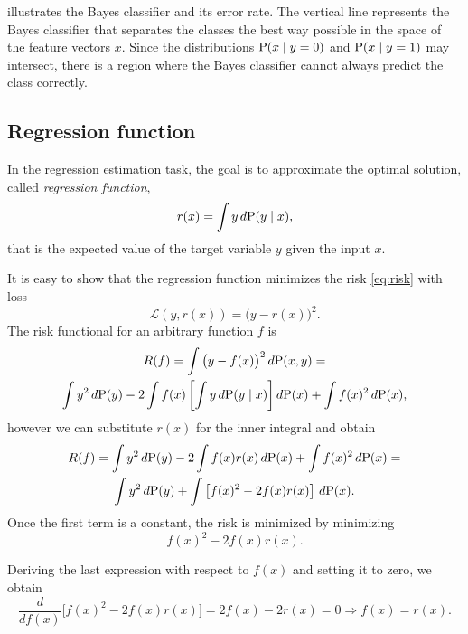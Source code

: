  illustrates the Bayes classifier and its error rate.
The vertical line represents the Bayes classifier that separates the classes the best way
possible in the space of the feature vectors $x$.  Since the distributions $\operatorname{P}(x \mid y
= 0)$ and $\operatorname{P}(x \mid y = 1)$ may intersect, there is a region where the Bayes
classifier cannot always predict the class correctly.

\subsection{Regression function}

In the regression estimation task, the goal is to approximate the optimal solution, called
\emph{regression function},
\begin{equation}
  \label{eq:regression-function}
  r(x) = \int y\, d\!\operatorname{P}(y \mid x)\text{,}
\end{equation}
that is the expected value of the target variable $y$ given the input $x$.

It is easy to show that the regression function minimizes the risk \eqref{eq:risk} with
loss
\[
  \mathcal{L}(y, r(x)) = \big(y - r(x)\big)^2\text{.}
\]
The risk functional for an arbitrary function $f$ is
\begin{multline*}
  R(f) =
    \int \big(y - f(x)\big)^2\, d\!\operatorname{P}(x, y) =\\
    \int y^2\, d\!\operatorname{P}(y) -
    2 \int f(x) \left[ \int y\, d\!\operatorname{P}(y \mid x) \right] d\!\operatorname{P}(x) +
    \int f(x)^2\, d\!\operatorname{P}(x)\text{,}
\end{multline*}
however we can substitute $r(x)$ for the inner integral and obtain
\begin{multline*}
  R(f) =
    \int y^2\, d\!\operatorname{P}(y) - 2 \int f(x) r(x)\, d\!\operatorname{P}(x) + \int f(x)^2\, d\!\operatorname{P}(x) = \\
    \int y^2\, d\!\operatorname{P}(y) + \int \left[ f(x)^2 - 2 f(x) r(x) \right]\, d\!\operatorname{P}(x)\text{.}
\end{multline*}
Once the first term is a constant, the risk is minimized by minimizing
\[
  f(x)^2 - 2 f(x) r(x)\text{.}
\]

Deriving the last expression with respect to $f(x)$ and setting it to zero, we obtain
\begin{equation*}
  \frac{d}{d f(x)} \Big[ f(x)^2 - 2 f(x) r(x) \Big] = 2 f(x) - 2 r(x) = 0 \Rightarrow
  f(x) = r(x)\text{.}
\end{equation*}

